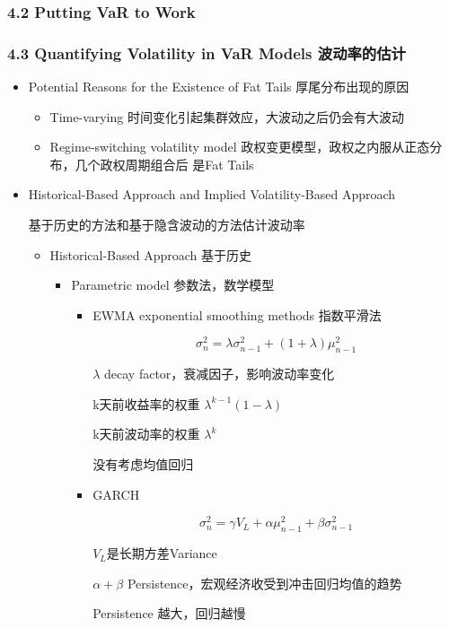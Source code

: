 \documentclass[a4paper,6pt,twoside,openany]{article}
\begin{document}
\subsubsection*{4.2 Putting VaR to Work}
\subsubsection*{4.3 Quantifying Volatility in VaR Models 波动率的估计}
\begin{itemize}
\item Potential Reasons for the Existence of Fat Tails 厚尾分布出现的原因
  \begin{itemize}
  \item Time-varying 时间变化引起集群效应，大波动之后仍会有大波动
  \item Regime-switching volatility model 政权变更模型，政权之内服从正态分布，几个政权周期组合后
    是Fat Tails
  \end{itemize}
\item Historical-Based Approach and Implied Volatility-Based Approach
  \par 基于历史的方法和基于隐含波动的方法估计波动率
  \begin{itemize}
  \item Historical-Based Approach 基于历史
    \begin{itemize}
    \item Parametric model 参数法，数学模型
      \begin{itemize}
      \item EWMA exponential smoothing methods 指数平滑法
        \par $$\sigma_n^2 = \lambda \sigma_{n-1}^2 + (1 + \lambda)\mu_{n-1}^2$$
        \par $\lambda$ decay factor，衰减因子，影响波动率变化
        \par k天前收益率的权重 $\lambda^{k-1}(1 - \lambda)$
        \par k天前波动率的权重 $\lambda^k$
        \par 没有考虑均值回归
      \item GARCH
        \par $$\sigma_n^2 = \gamma V_L + \alpha \mu_{n-1}^2 + \beta \sigma_{n-1}^2  $$
        \par $V_L$是长期方差Variance
        \par $\alpha + \beta$ Persistence，宏观经济收受到冲击回归均值的趋势
        \par Persistence 越大，回归越慢
      \end{itemize}

\end{itemize}
\end{itemize}
\end{itemize}
\end{document}
